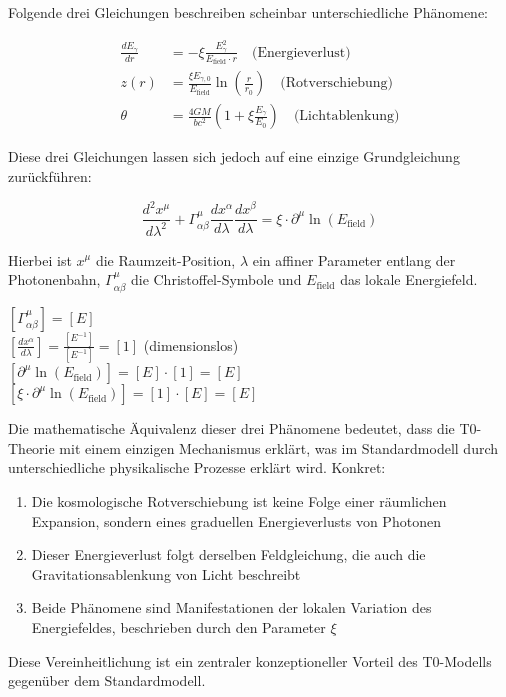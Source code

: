 \documentclass[12pt,a4paper]{article}
\theoremstyle{definition}
\begin{document}
Folgende drei Gleichungen beschreiben scheinbar unterschiedliche Phänomene:

\begin{align}
	\frac{dE_\gamma}{dr} &= -\xi \frac{E_\gamma^2}{E_{\text{field}} \cdot r} \quad \text{(Energieverlust)} \\
	z(r) &= \frac{\xi E_{\gamma,0}}{E_{\text{field}}} \ln\left(\frac{r}{r_0}\right) \quad \text{(Rotverschiebung)} \\
	\theta &= \frac{4GM}{bc^2}\left(1 + \xi \frac{E_\gamma}{E_0}\right) \quad \text{(Lichtablenkung)}
\end{align}

Diese drei Gleichungen lassen sich jedoch auf eine einzige Grundgleichung zurückführen:

\begin{equation}
	\boxed{\frac{d^2 x^\mu}{d\lambda^2} + \Gamma^\mu_{\alpha\beta}\frac{dx^\alpha}{d\lambda}\frac{dx^\beta}{d\lambda} = \xi \cdot \partial^\mu \ln(E_{\text{field}})}
\end{equation}

Hierbei ist $x^\mu$ die Raumzeit-Position, $\lambda$ ein affiner Parameter entlang der Photonenbahn, $\Gamma^\mu_{\alpha\beta}$ die Christoffel-Symbole und $E_{\text{field}}$ das lokale Energiefeld.

\begin{einheitencheck}
	$[\Gamma^\mu_{\alpha\beta}] = [E]$ \checkmark\\
	$[\frac{dx^\alpha}{d\lambda}] = \frac{[E^{-1}]}{[E^{-1}]} = [1]$ (dimensionslos) \checkmark\\
	$[\partial^\mu \ln(E_{\text{field}})] = [E] \cdot [1] = [E]$ \checkmark\\
	$[\xi \cdot \partial^\mu \ln(E_{\text{field}})] = [1] \cdot [E] = [E]$ \checkmark
\end{einheitencheck}

\begin{wichtig}
	Die mathematische Äquivalenz dieser drei Phänomene bedeutet, dass die T0-Theorie mit einem einzigen Mechanismus erklärt, was im Standardmodell durch unterschiedliche physikalische Prozesse erklärt wird. Konkret:
	
	\begin{enumerate}
		\item Die kosmologische Rotverschiebung ist keine Folge einer räumlichen Expansion, sondern eines graduellen Energieverlusts von Photonen
		\item Dieser Energieverlust folgt derselben Feldgleichung, die auch die Gravitationsablenkung von Licht beschreibt
		\item Beide Phänomene sind Manifestationen der lokalen Variation des Energiefeldes, beschrieben durch den Parameter $\xi$
	\end{enumerate}
	
	Diese Vereinheitlichung ist ein zentraler konzeptioneller Vorteil des T0-Modells gegenüber dem Standardmodell.
\end{wichtig}
\end{document}
